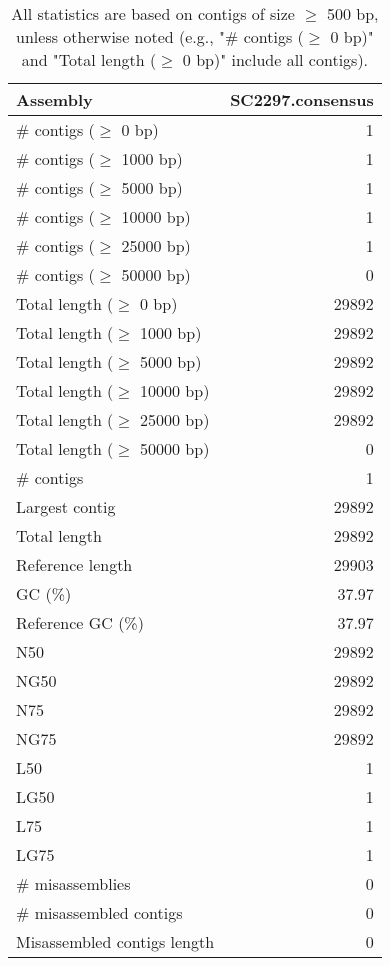 \documentclass[12pt,a4paper]{article}
\begin{document}
\begin{table}[ht]
\begin{center}
\caption{All statistics are based on contigs of size $\geq$ 500 bp, unless otherwise noted (e.g., "\# contigs ($\geq$ 0 bp)" and "Total length ($\geq$ 0 bp)" include all contigs).}
\begin{tabular}{|l*{1}{|r}|}
\hline
Assembly & SC2297.consensus \\ \hline
\# contigs ($\geq$ 0 bp) & 1 \\ \hline
\# contigs ($\geq$ 1000 bp) & 1 \\ \hline
\# contigs ($\geq$ 5000 bp) & 1 \\ \hline
\# contigs ($\geq$ 10000 bp) & 1 \\ \hline
\# contigs ($\geq$ 25000 bp) & 1 \\ \hline
\# contigs ($\geq$ 50000 bp) & 0 \\ \hline
Total length ($\geq$ 0 bp) & 29892 \\ \hline
Total length ($\geq$ 1000 bp) & 29892 \\ \hline
Total length ($\geq$ 5000 bp) & 29892 \\ \hline
Total length ($\geq$ 10000 bp) & 29892 \\ \hline
Total length ($\geq$ 25000 bp) & 29892 \\ \hline
Total length ($\geq$ 50000 bp) & 0 \\ \hline
\# contigs & 1 \\ \hline
Largest contig & 29892 \\ \hline
Total length & 29892 \\ \hline
Reference length & 29903 \\ \hline
GC (\%) & 37.97 \\ \hline
Reference GC (\%) & 37.97 \\ \hline
N50 & 29892 \\ \hline
NG50 & 29892 \\ \hline
N75 & 29892 \\ \hline
NG75 & 29892 \\ \hline
L50 & 1 \\ \hline
LG50 & 1 \\ \hline
L75 & 1 \\ \hline
LG75 & 1 \\ \hline
\# misassemblies & 0 \\ \hline
\# misassembled contigs & 0 \\ \hline
Misassembled contigs length & 0 \\ \hline

\end{tabular}
\end{center}
\end{table}
\end{document}
